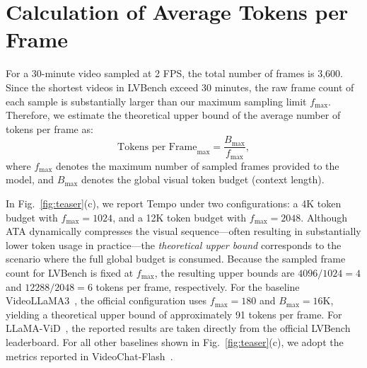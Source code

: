 \section{Calculation of Average Tokens per Frame}
\label{supp:a_token_calc}

For a 30-minute video sampled at 2 FPS, the total number of frames is 3,600. Since the shortest videos in LVBench exceed 30 minutes, the raw frame count of each sample is substantially larger than our maximum sampling limit $f_{\max}$. Therefore, we estimate the theoretical upper bound of the average number of tokens per frame as:
%
\begin{equation}
    \text{Tokens per Frame}_{\max} = \frac{B_{\max}}{f_{\max}},
\end{equation}
%
where $f_{\max}$ denotes the maximum number of sampled frames provided to the model, and $B_{\max}$ denotes the global visual token budget (context length).

In Fig.~\ref{fig:teaser}(c), we report Tempo under two configurations: a 4K token budget with $f_{\max}=1024$, and a 12K token budget with $f_{\max}=2048$. Although ATA dynamically compresses the visual sequence—often resulting in substantially lower token usage in practice—the \emph{theoretical upper bound} corresponds to the scenario where the full global budget is consumed.
%
Because the sampled frame count for LVBench is fixed at $f_{\max}$, the resulting upper bounds are $4096/1024 = 4$ and $12288/2048 = 6$ tokens per frame, respectively.
%
For the baseline VideoLLaMA3~\cite{zhang2025videollama}, the official configuration uses $f_{\max}=180$ and $B_{\max}=16\text{K}$, yielding a theoretical upper bound of approximately 91 tokens per frame.
%
For LLaMA-ViD~\cite{li2024llama}, the reported results are taken directly from the official LVBench leaderboard.
%
For all other baselines shown in Fig.~\ref{fig:teaser}(c), we adopt the metrics reported in VideoChat-Flash~\cite{li2024videochat}.